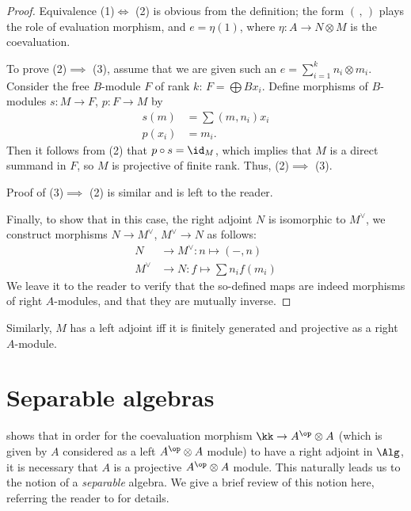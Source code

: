 \begin{proof}
  Equivalence (1)$\iff$ (2) is obvious from the definition; the form
  $(\, , \,)$ plays the role of evaluation morphism, and $e=\eta (1)$,
  where $\eta\colon A\to N\otimes M$ is the coevaluation.

  To prove (2)$\implies$ (3), assume that we are given such an
  $e=\sum_{i=1}^k n_i\otimes m_i$. Consider the free
  $B$-module $F$ of rank $k$: $F=\bigoplus B x_i$. Define morphisms
  of $B$-modules $s\colon M\to F$, $p\colon F\to M$ by
  \begin{align*}
  s(m)&=\sum (m, n_i)x_i\\
  p(x_i)&=m_i.
  \end{align*}
  Then it follows from (2) that $p\circ s =\id_{M}$, which implies that
  $M$ is a direct summand in $F$, so $M$ is projective of finite rank.
  Thus, (2)$\implies$ (3).

  Proof of (3)$\implies$ (2) is similar and is left to the reader.

  Finally, to show that in this case, the right adjoint $N$ is isomorphic
  to $M^\vee$, we construct morphisms $N\to M^\vee$, $M^\vee\to N$ as follows:
  \begin{align*}
    N&\to M^\vee\colon n\mapsto (-, n)\\
    M^\vee&\to N\colon f\mapsto \sum n_i f(m_i)
  \end{align*}
  We leave it to the reader to verify that the so-defined maps are indeed morphisms
  of right $A$-modules, and that they are mutually inverse.
\end{proof}

Similarly, $M$ has a left adjoint iff it is finitely generated and projective
as a right $A$-module.

\section{Separable algebras}\label{s:separable}

 shows that in order for the coevaluation morphism $\kk
\to A^\op\otimes A$ (which is given by $A$ considered as a left $A^\op \otimes
A$ module) to have a right adjoint in $\Alg$, it is necessary that $A$ is a
projective $A^\op\otimes A$ module. This naturally leads us to the notion of a
\emph{separable} algebra. We give a brief review of this notion here, referring
the reader to \cite[Chapter 10]{pierce} for details.


